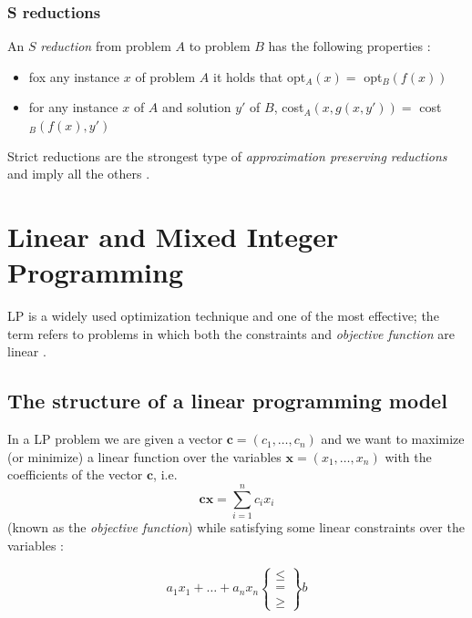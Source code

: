 \subsubsection{S reductions}%
\label{sub:strict_reductions}

An $S$ \emph{reduction} from problem $A$ to problem $B$ has the following properties \cite{Crescenzi1997ASG}:
\begin{itemize}
	\item fox any instance $x$ of problem $A$ it holds that opt$_{A} (x) = $ opt$_{B} (f(x))$
	\item for any instance $x$ of $A$ and solution $y'$ of $B$, cost$_{A} (x,
		      g(x, y')) = $ cost$_{B} (f(x), y')$
\end{itemize}

Strict reductions are the strongest type of \emph{approximation preserving
	reductions} and imply all the others \cite{Crescenzi1997ASG}.

\section{Linear and Mixed Integer Programming}%
\label{sec:linear_and_mixed_integer_programming}

\acrlong{LP} is a widely used optimization technique and one of the most
effective; the term refers to problems in which both the constraints and \emph{objective
	function} are linear
\cite{Edgar2001}\cite{Vanderbei2008}\cite{Dantzig1998}\cite{Martin1998}.

\subsection{The structure of a linear programming model}%
\label{sub:the_structure_of_a_linear_programming_model}

In a \acrfull{LP} problem we are given a vector $ \mathbf{c} = (c_1,
	\dots, c_n) $ and we want to maximize (or minimize) a linear function over
the variables $ \mathbf{x} = (x_1, \dots, x_n) $ with the coefficients of the
vector $ \mathbf{c} $, i.e.
\begin{equation*}
	\mathbf{cx} = \sum^{n}_{i=1} c_i x_i
\end{equation*}
(known as the \emph{objective function}) while satisfying some linear
constraints over the variables \cite{Bertsimas1997}\cite{Vanderbei2008}:

\begin{equation*}
	a_1 x_1 + \dots + a_n x_n \begin{Bmatrix} \leq \\ = \\ \geq \end{Bmatrix} b
\end{equation*}

